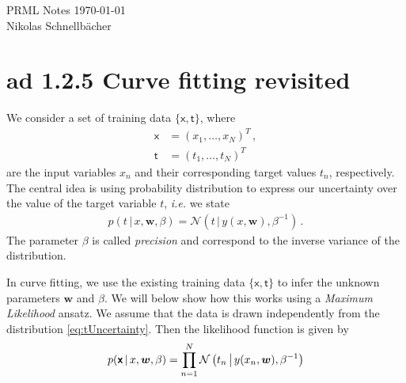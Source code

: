 \documentclass[11pt,DINA4, fleqn]{amsart}
\begin{document}

\tikzset{node distance = 2cm, auto}



\begin{flushleft}
{\sc \Large PRML Notes} \hfill \today \\
\medskip
Nikolas Schnellbächer \underline{\hspace{6.53in}} \\
\end{flushleft}

\section*{ad 1.2.5 Curve fitting revisited}
We consider a set of training data $\{\boldsymbol{\mathsf{x}}, \boldsymbol{\mathsf{t}}\}$, where
\begin{align}
\boldsymbol{\mathsf{x}} &= (x_1, \dots, x_N)^T \, , \\
\boldsymbol{\mathsf{t}} &= (t_1, \dots, t_N)^T
\end{align}
are the input variables $x_n$ and their corresponding target values $t_n$, respectively.
The central idea is using probability distribution to  express our uncertainty over the value of the target variable $t$, \textit{i.e.} we state
\begin{align}
p(t \, | \, x, \bm{w}, \beta) = \mathcal{N}\left(
t \, \bigl| \, y(x,\bm{w}), \beta^{-1}\right) \, .
\label{eq:tUncertainty}
\end{align}
The parameter $\beta$ is called \emph{precision} and correspond to the inverse variance of the distribution.

In curve fitting, we use the existing training data $\{\boldsymbol{\mathsf{x}}, \boldsymbol{\mathsf{t}}\}$ to infer the unknown parameters $\bm{w}$ and $\beta$.
We will below show how this works using a \emph{Maximum Likelihood} ansatz.
We assume that the data is drawn independently from the distribution \eqref{eq:tUncertainty}. Then the likelihood function is given by
\begin{align}
p(\boldsymbol{\mathsf{x}} \, | \, x, \bm{w}, \beta) = 
\prod\displaylimits_{n = 1}^{N}
\mathcal{N}\left(
t_n \, \bigl| \, y(x_n,\bm{w}), \beta^{-1}\right)
\label{eq:likelihoodFunc}
\end{align}
\end{document}
